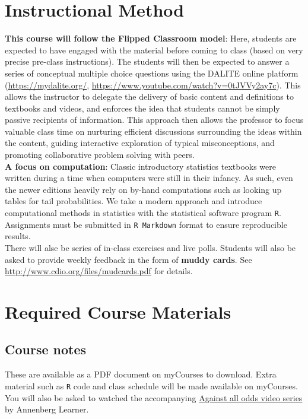 \documentclass[]{article}
\begin{document}
\section{Instructional Method}
\textbf{This course will follow the Flipped Classroom model}: Here, students are expected to have engaged with the material before coming to class (based on very precise pre-class instructions). The students will then be expected to answer a series of conceptual multiple choice questions using the DALITE online platform (\url{https://mydalite.org/}, \url{https://www.youtube.com/watch?v=0tJVVy2ay7c}). This allows the instructor to delegate the delivery of basic content and definitions to textbooks and videos, and enforces the idea that students cannot be simply passive recipients of information. This approach then allows the professor to focus valuable class time on nurturing efficient discussions surrounding the ideas within the content, guiding interactive exploration of typical misconceptions, and promoting collaborative problem solving with peers.\\

\textbf{A focus on computation}: Classic introductory statistics textbooks were written during a time when computers were still in their infancy. As such, even the newer editions heavily rely on by-hand computations such as looking up tables for tail probabilities. We take a modern approach and introduce computational methods in statistics with the statistical software program \texttt{R}. Assignments must be submitted in \texttt{R Markdown} format to ensure reproducible results. \\

There will alse be series of in-class exercises and live polls. Students will also be asked to provide weekly feedback in the form of \textbf{muddy cards}. See \url{http://www.cdio.org/files/mudcards.pdf} for details. 

\section{Required Course Materials}

\subsection{Course notes}
These are available as a PDF document on myCourses to download. Extra material such as \texttt{R} code and class schedule will be made available on myCourses. You will also be asked to watched the accompanying \href{https://www.learner.org/courses/againstallodds/unitpages/index.html}{Against all odds video series} by Annenberg Learner.
\end{document}
